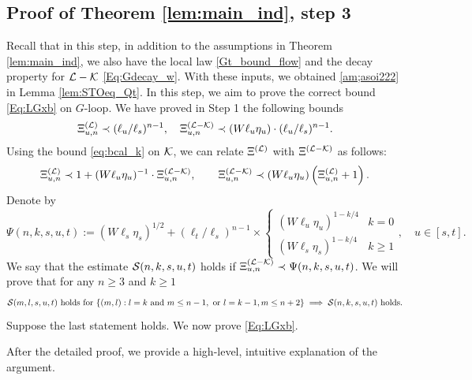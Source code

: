 \documentclass[10pt,reqno]{article}
\theoremstyle{plain} %
\theoremstyle{remark}
\numberwithin{equation}{section}
\begin{document}
 \subsection{Proof of Theorem \ref{lem:main_ind}, step 3}
Recall  that in this step, in addition to the assumptions in Theorem \ref{lem:main_ind}, we also have the local law \eqref{Gt_bound_flow} and the decay property for $\cal L-\cal K$ \eqref{Eq:Gdecay_w}. With these inputs, we obtained \eqref{am;asoi222} %
in Lemma \ref{lem:STOeq_Qt}.  In this step,  we aim to prove the correct bound \eqref{Eq:LGxb} on $G$-loop. 
We  have proved in  Step 1 the following bounds 
\begin{align}\label{sef8w483r324}
  \Xi^{(\cal L)}_{u,n}\prec(\ell_u/\ell_s)^{n-1}, \quad 
 \Xi^{({\cal L-K})}_{u, n}\prec (W\ell_u\eta_u)\cdot (\ell_u/\ell_s)^{n-1} .
\end{align}
Using  the bound \eqref{eq:bcal_k} on $\cal K$, we can relate $\Xi^{(\cal L)}$ with $\Xi^{(\cal L-\cal K)}$ as follows:
\begin{align}\label{rela_XILXILK}
    \Xi^{(\cal L)}_{u,n}\prec 1+(W\ell_u\eta_u)^{-1}\cdot \Xi^{({\cal L-\cal K})}_{u, n},\quad \quad \Xi^{({\cal L-\cal K})}_{u, n}
\prec (W\ell_u\eta_u) \left(\Xi^{(\cal L)}_{u,n}+1\right).
\end{align}
Denote by 
\begin{equation}\label{adsyzz0s8d6}
      \Psi(n,k,s,u,t):=  (W\ell_s\eta_s)^{1/2}+(\ell_t/\ell_s)^{n-1}\times
    \begin{cases}
        (W\ell_u\eta_u)^{1-k/4} &  k=0\\
        (W\ell_s\eta_s)^{1-k/4} &  k\ge 1 
    \end{cases},\quad u\in [s,t] .
\end{equation}
We say that the estimate $ {\cal S}(n,k,s,u,t)$ holds if $\Xi^{({\cal L-K})}_{ u,n}\prec   \Psi(n,k,s,u,t)$.
We will prove that for any $n \ge 3$ and $k \ge 1$ %
\begin{align}\label{St3MnAsm} 
{\cal S}(m, l,s,u,t)  \text{ holds for }  \{(m, l) : l=k \text{ and }  m \le n-1, \text{ or } l=k-1,   m \le n+2 \}  
\implies 
{\cal S}(n,k,s,u,t)  \text{ holds}.
\end{align} 
Suppose the last statement  holds. We now prove  \eqref{Eq:LGxb}. 

After the detailed proof, we provide a high-level, intuitive explanation of the argument.
%
%
%
%
\end{document}
